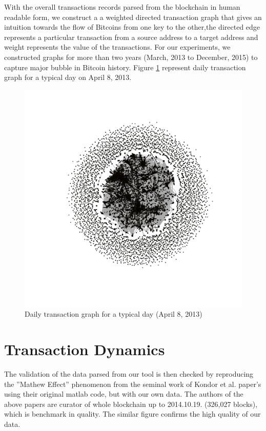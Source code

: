 With the overall transactions records parsed from the blockchain in human readable form, we construct a a weighted directed transaction graph that gives an intuition towards the flow of Bitcoins from one key to the other,the directed edge represents a particular transaction from a source address to a target address and weight represents the value of the transactions. For our experiments, we constructed graphs for more than two years (March, 2013 to December, 2015) to capture major bubble in Bitcoin history. Figure \ref{fig:dt} represent daily transaction graph for a typical day on April 8, 2013.

\begin{figure}[ht]
\begin{center}
\includegraphics[width=\textwidth]{./Figures/dt.png}
\caption{ Daily transaction graph for a typical day (April 8, 2013)}
\label{fig:dt}
\end{center}
\end{figure}

\section{Transaction Dynamics}
The validation of the data parsed from our tool is then checked by
reproducing the ”Mathew Effect” phenomenon from the seminal work of Kondor et al. \citep{Csabai2014} paper’s using their original matlab code, but with our own data. The authors of the above papers are curator of whole blockchain up to 2014.10.19. (326,027 blocks), which is benchmark in quality. The similar figure confirms the high quality of our data.

